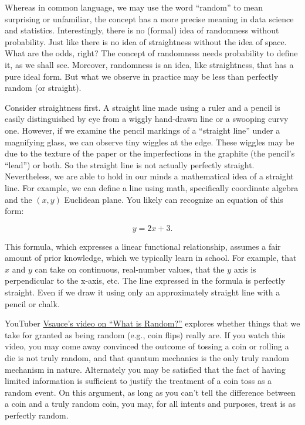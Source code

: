 \documentclass[
  openany]{book}
\begin{document}
Whereas in common language, we may use the word ``random'' to mean surprising or unfamiliar, the concept has a more precise meaning in data science and statistics. Interestingly, there is no (formal) idea of randomness without probability. Just like there is no idea of straightness without the idea of space. What are the odds, right? The concept of randomness needs probability to define it, as we shall see. Moreover, randomness is an idea, like straightness, that has a pure ideal form. But what we observe in practice may be less than perfectly random (or straight).

Consider straightness first. A straight line made using a ruler and a pencil is easily distinguished by eye from a wiggly hand-drawn line or a swooping curvy one. However, if we examine the pencil markings of a ``straight line'' under a magnifying glass, we can observe tiny wiggles at the edge. These wiggles may be due to the texture of the paper or the imperfections in the graphite (the pencil's ``lead'') or both. So the straight line is not actually perfectly straight. Nevertheless, we are able to hold in our minds a mathematical idea of a straight line. For example, we can define a line using math, specifically coordinate algebra and the \((x,y)\) Euclidean plane. You likely can recognize an equation of this form:

\[ y = 2 x + 3.\]

This formula, which expresses a linear functional relationship, assumes a fair amount of prior knowledge, which we typically learn in school. For example, that \(x\) and \(y\) can take on continuous, real-number values, that the \(y\) axis is perpendicular to the x-axis, etc. The line expressed in the formula is perfectly straight. Even if we draw it using only an approximately straight line with a pencil or chalk.

YouTuber \href{https://www.youtube.com/watch?v=9rIy0xY99a0}{Vsauce's video on ``What is Random?''} explores whether things that we take for granted as being random (e.g., coin flips) really are. If you watch this video, you may come away convinced the outcome of tossing a coin or rolling a die is not truly random, and that quantum mechanics is the only truly random mechanism in nature. Alternately you may be satisfied that the fact of having limited information is sufficient to justify the treatment of a coin toss as a random event. On this argument, as long as you can't tell the difference between a coin and a truly random coin, you may, for all intents and purposes, treat is as perfectly random.
\end{document}
